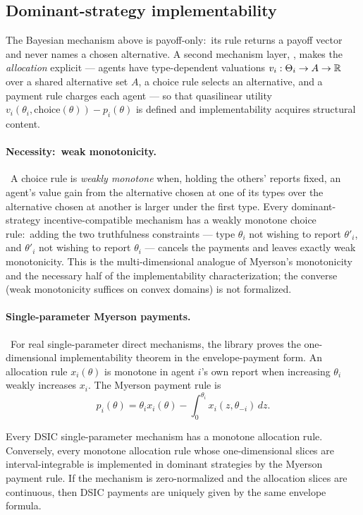 \subsection{Dominant-strategy implementability}
\label{sec:mech:implementability}

The Bayesian mechanism above is payoff-only:\ its rule returns a
payoff vector and never names a chosen alternative.  A second
mechanism layer, , makes the \emph{allocation}
explicit — agents have type-dependent valuations
$v_i : \Theta_i \to A \to \mathbb{R}$ over a shared alternative set $A$, a
choice rule selects an alternative, and a payment rule charges each
agent — so that quasilinear utility
$v_i(\theta_i, \mathrm{choice}(\theta)) - p_i(\theta)$ is defined and
implementability acquires structural content.

\paragraph{Necessity:\ weak monotonicity.}\
A choice rule is \emph{weakly monotone} when, holding the others'
reports fixed, an agent's value gain from the alternative chosen at one
of its types over the alternative chosen at another is larger under the
first type.  Every dominant-strategy incentive-compatible mechanism has
a weakly monotone choice rule:\ adding the two truthfulness
constraints — type $\theta_i$ not wishing to report $\theta'_i$, and
$\theta'_i$ not wishing to report $\theta_i$ — cancels the payments and
leaves exactly weak monotonicity.  This is the multi-dimensional
analogue of Myerson's monotonicity~\citep{Bikhchandani2006,
Myerson1981} and the necessary half of the implementability
characterization; the converse (weak monotonicity suffices on convex
domains) is not formalized.

\paragraph{Single-parameter Myerson payments.}\
For real single-parameter direct mechanisms, the library proves the
one-dimensional implementability theorem in the envelope-payment form.
An allocation rule $x_i(\theta)$ is monotone in agent $i$'s own report
when increasing $\theta_i$ weakly increases $x_i$.  The Myerson
payment rule is
\[
  p_i(\theta)
    =
  \theta_i x_i(\theta)
    -
  \int_{0}^{\theta_i}
      x_i(z,\theta_{-i})\,dz .
\]

\begin{theorem}
\label{thm:myerson-payments}
Every DSIC single-parameter mechanism has a monotone allocation rule.
Conversely, every monotone allocation rule whose one-dimensional slices
are interval-integrable is implemented in dominant strategies by the
Myerson payment rule.  If the mechanism is zero-normalized and the
allocation slices are continuous, then DSIC payments are uniquely
given by the same envelope formula.
\end{theorem}

